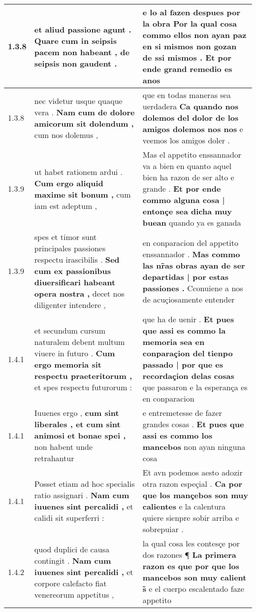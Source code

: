 \begin{tabular}{|p{1cm}|p{6.5cm}|p{6.5cm}|}
1.3.8 & et aliud passione agunt . \textbf{ Quare cum in seipsis pacem non habeant , } de seipsis non gaudent . & e lo al fazen despues por la obra \textbf{ Por la qual cosa commo ellos non ayan paz en si mismos non gozan de ssi mismos . } Et por ende grand remedio es anos \\\hline
1.3.8 & nec videtur usque quaque vera . \textbf{ Nam cum de dolore amicorum sit dolendum , } cum nos dolemus , & que en todas maneras sea uerdadera \textbf{ Ca quando nos dolemos del dolor de los amigos dolemos nos nos } e veemos los amigos doler . \\\hline
1.3.9 & ut habet rationem ardui . \textbf{ Cum ergo aliquid maxime sit bonum , } cum iam est adeptum , & Mas el appetito enssannador va a bien en quanto aquel bien ha razon de ser alto e grande . \textbf{ Et por ende commo alguna cosa | entonçe sea dicha muy buean } quando ya es ganada \\\hline
1.3.9 & spes et timor sunt principales passiones respectu irascibilis . \textbf{ Sed cum ex passionibus diuersificari habeant opera nostra , } decet nos diligenter intendere , & en conparacion del appetito enssannador . \textbf{ Mas commo las nr̃as obras ayan de ser departidas | por estas passiones . } Cconuiene a nos de acuçiosamente entender \\\hline
1.4.1 & et secundum cursum naturalem debent multum viuere in futuro . \textbf{ Cum ergo memoria sit respectu praeteritorum , } et spes respectu futurorum : & que ha de uenir . \textbf{ Et pues que assi es commo la memoria sea en conparaçion del tienpo passado | por que es recordaçion delas cosas } que passaron e la esperança es en conparacion \\\hline
1.4.1 & Iuuenes ergo , \textbf{ cum sint liberales , et cum sint animosi et bonae spei , } non habent unde retrahantur & e entremetesse de fazer grandes cosas . \textbf{ Et pues que assi es commo los mancebos } non ayan ninguna cosa \\\hline
1.4.1 & Posset etiam ad hoc specialis ratio assignari . \textbf{ Nam cum iuuenes sint percalidi , } et calidi sit superferri : & Et avn podemos aesto adozir otra razon espeçial . \textbf{ Ca por que los mançebos son muy calientes } e la calentura quiere sienpre sobir arriba e sobrepuiar . \\\hline
1.4.2 & quod duplici de causa contingit . \textbf{ Nam cum iuuenes sint percalidi , } et corpore calefacto fiat venereorum appetitus , & la qual cosa les contesçe por dos razones ¶ \textbf{ La primera razon es que por que los mancebos son muy calient s̃ } e el cuerpo escalentado faze appetito \\\hline

\end{tabular}
